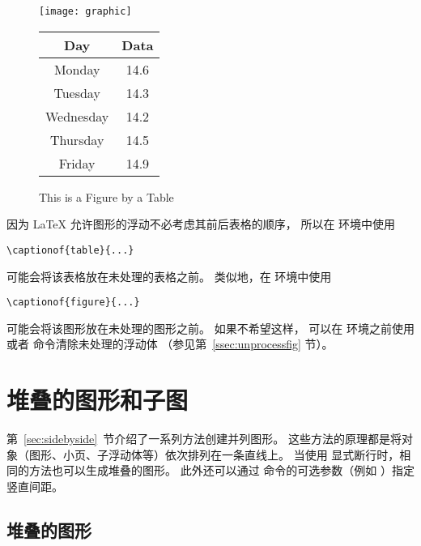 \begin{figure}[htb]
	\begin{minipage}[b]{0.5\linewidth}
		\centering
		\texttt{[image: graphic]}
		\caption{This is a Figure by a Table}
		\label{fig:by:table}
	\end{minipage}%
	\begin{minipage}[b]{0.5\linewidth}
		\centering
		\begin{tabular}{|c|c|} \hline
			Day & Data \\ \hline\hline
			Monday & 14.6 \\
			Tuesday & 14.3 \\
			Wednesday & 14.2 \\
			Thursday & 14.5 \\
			Friday & 14.9 \\ \hline
		\end{tabular}
		\label{table:by:fig}
	\end{minipage}
\end{figure}

因为 \LaTeX{} 允许图形的浮动不必考虑其前后表格的顺序，
所以在  环境中使用
\begin{lstlisting}
\captionof{table}{...}
\end{lstlisting}
可能会将该表格放在未处理的表格之前。
类似地，在  环境中使用
\begin{lstlisting}
\captionof{figure}{...}
\end{lstlisting}
可能会将该图形放在未处理的图形之前。
如果不希望这样，
可以在  环境之前使用  或者  命令清除未处理的浮动体
（参见第~\ref{ssec:unprocessfig} 节）。


\section{堆叠的图形和子图}

第~\ref{sec:sidebyside}~节介绍了一系列方法创建并列图形。
这些方法的原理都是将对象（图形、小页、子浮动体等）依次排列在一条直线上。
当使用 \cmd{\cmd{}} 显式断行时，相同的方法也可以生成堆叠的图形。
此外还可以通过 \cmd{\cmd{}} 命令的可选参数（例如 \cmd{\cmd{}}\opt{[20pt]}）指定竖直间距。

\subsection{堆叠的图形}

